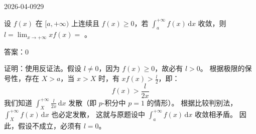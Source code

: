 \begin{mistake}{2026-04-09}{29}

\begin{problemcontent}
设 \( f(x) \) 在 \( [a, +\infty) \) 上连续且 \( f(x) \ge 0 \)，若 \( \displaystyle\int_a^{+\infty} f(x)\,\mathrm{d}x \) 收敛，则 \( l = \lim_{x \to +\infty} x f(x) = \) \underline{\hspace{2cm}}。
\end{problemcontent}

\begin{solutioncontent}
答案：\( 0 \)

证明：使用反证法。假设 \( l \neq 0 \)，因为 \( f(x) \ge 0 \)，故必有 \( l > 0 \)。
根据极限的保号性，存在 \( X > a \)，当 \( x > X \) 时，有 \( xf(x) > \frac{l}{2} \)，即：
\[
f(x) > \frac{l}{2x}
\]
我们知道
\( \displaystyle\int_X^{+\infty}\frac{l}{2x}\,\mathrm{d}x \) 发散（即 \( p \)-积分中 \( p=1 \) 的情形）。
根据比较判别法，
\( \displaystyle\int_X^{+\infty} f(x)\,\mathrm{d}x \) 也必定发散，
这就与原题设中 \( \displaystyle\int_a^{+\infty} f(x)\,\mathrm{d}x \) 收敛相矛盾。
因此，假设不成立，必须有 \( l = 0 \)。
\end{solutioncontent}


\end{mistake}
